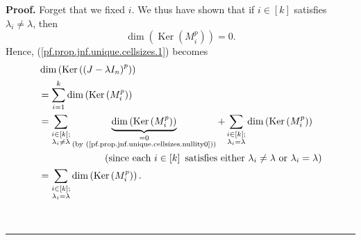 \documentclass[numbers=enddot,12pt,final,onecolumn,notitlepage]{scrartcl}%
\numberwithin{exer}{subsection}
\theoremstyle{definition}
\newenvironment{proof}[1][Proof]{\noindent\textbf{#1.} }{\ \rule{0.5em}{0.5em}}
\let\sumnonlimits\sum
\renewcommand{\sum}{\sumnonlimits\limits}
\begin{document}
\begin{proof}
Forget that we fixed $i$. We thus have shown that if $i\in\left[  k\right]  $
satisfies $\lambda_{i}\neq\lambda$, then
\begin{equation}
\dim\left(  \operatorname*{Ker}\left(  M_{i}^{p}\right)  \right)  =0\text{.}
\label{pf.prop.jnf.unique.cellsizes.nullity0}%
\end{equation}
Hence, (\ref{pf.prop.jnf.unique.cellsizes.1}) becomes%
\begin{align}
&  \dim\left(  \operatorname*{Ker}\left(  \left(  J-\lambda I_{n}\right)
^{p}\right)  \right) \nonumber\\
&  =\sum_{i=1}^{k}\dim\left(  \operatorname*{Ker}\left(  M_{i}^{p}\right)
\right) \nonumber\\
&  =\sum_{\substack{i\in\left[  k\right]  ;\\\lambda_{i}\neq\lambda
}}\underbrace{\dim\left(  \operatorname*{Ker}\left(  M_{i}^{p}\right)
\right)  }_{\substack{=0\\\text{(by
(\ref{pf.prop.jnf.unique.cellsizes.nullity0}))}}}+\sum_{\substack{i\in\left[
k\right]  ;\\\lambda_{i}=\lambda}}\dim\left(  \operatorname*{Ker}\left(
M_{i}^{p}\right)  \right) \nonumber\\
&  \ \ \ \ \ \ \ \ \ \ \ \ \ \ \ \ \ \ \ \ \left(  \text{since each }%
i\in\left[  k\right]  \text{ satisfies either }\lambda_{i}\neq\lambda\text{ or
}\lambda_{i}=\lambda\right) \nonumber\\
&  =\sum_{\substack{i\in\left[  k\right]  ;\\\lambda_{i}=\lambda}}\dim\left(
\operatorname*{Ker}\left(  M_{i}^{p}\right)  \right)  .
\label{pf.prop.jnf.unique.cellsizes.2}%
\end{align}



\end{proof}
\end{document}
